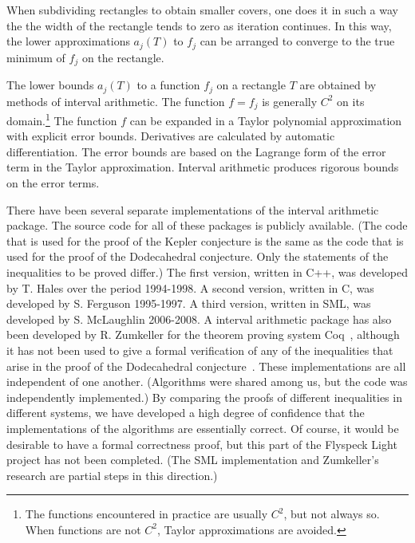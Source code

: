 \documentclass{article} %
\begin{document}
When subdividing rectangles to obtain smaller covers, one does
it in such a way the the width of the rectangle tends to zero
as iteration continues.
In this way,  the lower approximations 
$a_j(T)$ to $f_j$ can be arranged to converge to the true minimum of $f_j$ on the
rectangle.

The lower bounds $a_j(T)$ to a function $f_j$ on a rectangle $T$
are obtained by methods of interval arithmetic.  The function
$f=f_j$ is generally $C^2$ on its domain.\footnote{The functions
 encountered in practice are usually $C^2$, but not always so.  When functions are not
$C^2$,  Taylor approximations are avoided.}  
The function $f$ can be expanded in a Taylor polynomial approximation with
explicit error bounds.  Derivatives are calculated by automatic
differentiation.  The error bounds are based on the Lagrange form of
the error term in the Taylor approximation.  Interval arithmetic produces rigorous bounds on the error terms.


There have been several separate implementations of the interval
arithmetic package. The source code for all of these packages is
publicly available. (The code that is used for the proof of the Kepler
conjecture is the same as the code that is used for the proof of the
Dodecahedral conjecture. Only the statements of the inequalities to be
proved differ.) The first version, written in
C++, was developed by T. Hales over the
period 1994-1998. A second version, written in C, was developed by S.
Ferguson 1995-1997. A third version, written in SML, was developed by
S. McLaughlin 2006-2008. A interval arithmetic package has also been
developed by R. Zumkeller for the theorem proving system
Coq~\cite{Bertot:2004:CoqBook}, although it has not been used to give
a formal verification of any of the inequalities that arise in the
proof of the Dodecahedral conjecture~\cite{Zumkeller:2008:Thesis}.
These implementations are all independent of one another. (Algorithms
were shared among us, but the code was independently implemented.) By
comparing the proofs of different inequalities in different systems,
we have developed a high degree of confidence that the implementations
of the algorithms are essentially correct. Of course, it would be
desirable to have a formal correctness proof, but this part of the
Flyspeck Light project has not been completed. (The SML implementation
and Zumkeller's research are partial steps in this direction.)
\end{document}
